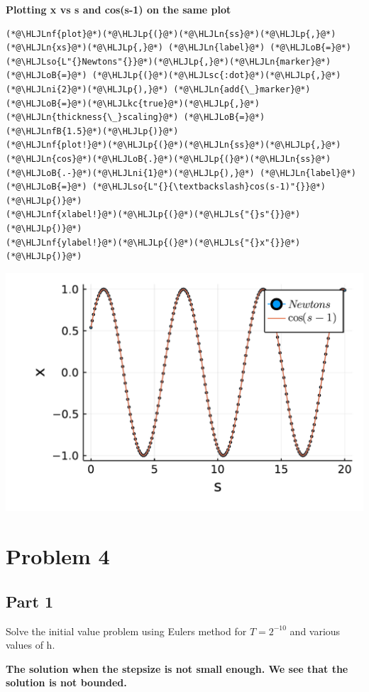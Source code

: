 \documentclass[12pt,a4paper]{article}
\newcommand{\HLJLkc}[1]{\textcolor[RGB]{59,151,46}{\textit{#1}}}
\newcommand{\HLJLn}[1]{#1}
\newcommand{\HLJLnf}[1]{\textcolor[RGB]{66,102,213}{#1}}
\newcommand{\HLJLs}[1]{\textcolor[RGB]{201,61,57}{#1}}
\newcommand{\HLJLsc}[1]{\textcolor[RGB]{201,61,57}{#1}}
\newcommand{\HLJLso}[1]{\textcolor[RGB]{201,61,57}{#1}}
\newcommand{\HLJLnfB}[1]{\textcolor[RGB]{59,151,46}{#1}}
\newcommand{\HLJLni}[1]{\textcolor[RGB]{59,151,46}{#1}}
\newcommand{\HLJLoB}[1]{\textcolor[RGB]{102,102,102}{\textbf{#1}}}
\newcommand{\HLJLp}[1]{#1}
\begin{document}
\textbf{Plotting x vs s and cos(s-1) on the same plot}


\begin{lstlisting}
(*@\HLJLnf{plot}@*)(*@\HLJLp{(}@*)(*@\HLJLn{ss}@*)(*@\HLJLp{,}@*)(*@\HLJLn{xs}@*)(*@\HLJLp{,}@*) (*@\HLJLn{label}@*) (*@\HLJLoB{=}@*) (*@\HLJLso{L"{}Newtons"{}}@*)(*@\HLJLp{,}@*)(*@\HLJLn{marker}@*) (*@\HLJLoB{=}@*) (*@\HLJLp{(}@*)(*@\HLJLsc{:dot}@*)(*@\HLJLp{,}@*)(*@\HLJLni{2}@*)(*@\HLJLp{),}@*) (*@\HLJLn{add{\_}marker}@*)(*@\HLJLoB{=}@*)(*@\HLJLkc{true}@*)(*@\HLJLp{,}@*) (*@\HLJLn{thickness{\_}scaling}@*) (*@\HLJLoB{=}@*) (*@\HLJLnfB{1.5}@*)(*@\HLJLp{)}@*)
(*@\HLJLnf{plot!}@*)(*@\HLJLp{(}@*)(*@\HLJLn{ss}@*)(*@\HLJLp{,}@*) (*@\HLJLn{cos}@*)(*@\HLJLoB{.}@*)(*@\HLJLp{(}@*)(*@\HLJLn{ss}@*)(*@\HLJLoB{.-}@*)(*@\HLJLni{1}@*)(*@\HLJLp{),}@*) (*@\HLJLn{label}@*) (*@\HLJLoB{=}@*) (*@\HLJLso{L"{}{\textbackslash}cos(s-1)"{}}@*)(*@\HLJLp{)}@*)
(*@\HLJLnf{xlabel!}@*)(*@\HLJLp{(}@*)(*@\HLJLs{"{}s"{}}@*)(*@\HLJLp{)}@*)
(*@\HLJLnf{ylabel!}@*)(*@\HLJLp{(}@*)(*@\HLJLs{"{}x"{}}@*)(*@\HLJLp{)}@*)
\end{lstlisting}

\includegraphics[width=\linewidth]{figures/ass_1_report_5_1.pdf}

\section{Problem 4}
\subsection{Part 1}
Solve the initial value problem using Eulers method for $T = 2^{-10}$ and various values of h.

\textbf{The solution when the stepsize is not small enough. We see that the solution is not bounded.}
\end{document}
